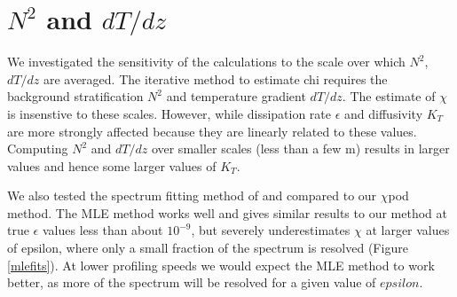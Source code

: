 \documentclass{ametsoc}
\begin{document}


\section{$N^2$ and $dT/dz$}

We investigated the sensitivity of the calculations to the scale over which $N^2$, $dT/dz$ are averaged. The iterative method to estimate chi requires the background stratification $N^2$ and temperature gradient $dT/dz$. The estimate of $\chi$ is insenstive to these scales. However, while dissipation rate $\epsilon$ and diffusivity $K_T$ are more strongly affected because they are linearly related to these values. Computing $N^2$ and $dT/dz$ over smaller scales (less than a few m) results in larger values and hence some larger values of $K_T$.

%
%
%

\appendix[B]


We also tested the spectrum fitting method of \cite{ruddicketal00} and compared to our $\chi$pod method. The MLE method works well and gives similar results to our method at true $\epsilon$ values less than about $10^{-9}$, but severely underestimates $\chi$ at larger values of epsilon, where only a small fraction of the spectrum is resolved (Figure \ref{mlefits}). At lower profiling speeds we would expect the MLE method to work better, as more of the spectrum will be resolved for a given value of $epsilon$.


\appendix[D]


\end{document}
